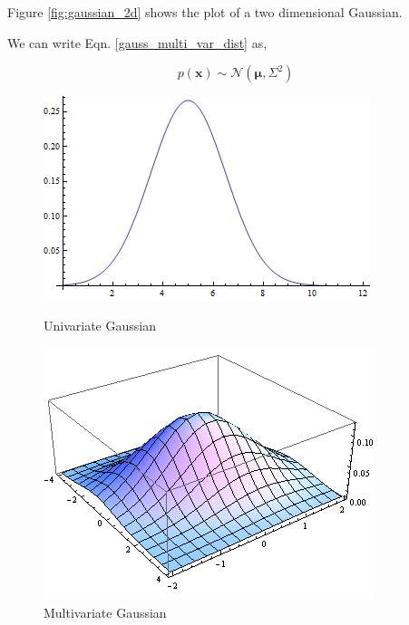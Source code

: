\documentclass[english]{tktltiki}
\begin{document}
Figure \ref{fig:gaussian_2d} shows the plot of a two dimensional Gaussian.

We can write Eqn. \ref{gauss_multi_var_dist} as,

\begin{equation}
p(\mathbf{x}) \sim \mathcal{N}(\mathbf{\mu}, \Sigma^2)
\label{gauss_multi_var_sym}
\end{equation}

\begin{figure}
\centering
\begin{minipage}{.5\linewidth}
  \centering
  \includegraphics[width=\linewidth]{gp_1d.png}
  \caption{Univariate Gaussian}
  \label{fig:gaussian_1d}
\end{minipage}%
\begin{minipage}{.41\linewidth}
  \centering
  \includegraphics[width=\linewidth]{gp_2d.png}
  \caption{Multivariate Gaussian}
  \label{fig:gaussian_2d}
\end{minipage}

\label{fig:test}
\end{figure}
\end{document}
